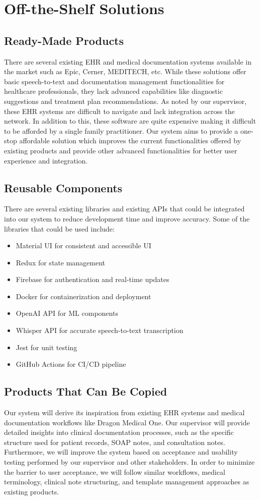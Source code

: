 \documentclass[12pt]{article}
\begin{document}
\section{Off-the-Shelf Solutions}
\subsection{Ready-Made Products}
There are several existing EHR and medical documentation systems available in the market such as Epic, Cerner, MEDITECH, etc. While these solutions offer basic speech-to-text and documentation management functionalities for healthcare professionals, they lack advanced capabilities like diagnostic suggestions and treatment plan recommendations. As noted by our supervisor, these EHR systems are difficult to navigate and lack integration across the network. In addition to this, these software are quite expensive making it difficult to be afforded by a single family practitioner. Our system aims to provide a one-stop affordable solution which improves the current functionalities offered by existing products and provide other advanced functionalities for better user experience and integration.

\subsection{Reusable Components}
There are several existing libraries and existing APIs that could be integrated into our system to reduce development time and improve accuracy. Some of the libraries that could be used include:

\begin{itemize}
  \item Material UI for consistent and accessible UI
  \item Redux for state management
  \item Firebase for authentication and real-time updates
  \item Docker for containerization and deployment
  \item OpenAI API for ML components
  \item Whisper API for accurate speech-to-text transcription
  \item Jest for unit testing
  \item GitHub Actions for CI/CD pipeline 
\end{itemize}

\subsection{Products That Can Be Copied}
Our system will derive its inspiration from existing EHR systems and medical documentation workflows like Dragon Medical One. Our supervisor will provide detailed insights into clinical documentation processes, such as the specific structure used for patient records, SOAP notes, and consultation notes. Furthermore, we will improve the system based on acceptance and usability testing performed by our supervisor and other stakeholders. In order to minimize the barrier to user acceptance, we will follow similar workflows, medical terminology, clinical note structuring, and template management approaches as existing products.
\end{document}
